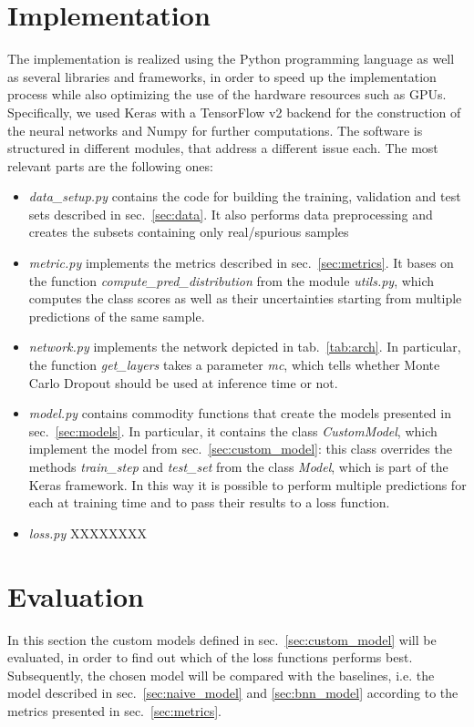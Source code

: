\documentclass[11pt,twoside,a4paper]{article}
\begin{document}
\section{Implementation}
\label{sec:implementation}
The implementation is realized using the Python programming language as well as several libraries and frameworks, in order to speed up the implementation process while also optimizing the use of the hardware resources such as GPUs. Specifically, we used Keras with a TensorFlow v2 backend for the construction of the neural networks and Numpy for further computations.\newline
The software is structured in different modules, that address a different issue each. The most relevant parts are the following ones:
\begin{itemize}
\item \emph{data\_setup.py} contains the code for building the training, validation and test sets described in sec.~\ref{sec:data}. It also performs data preprocessing and creates the subsets containing only real/spurious samples
\item \emph{metric.py} implements the metrics described in sec.~\ref{sec:metrics}. It bases on the function \emph{compute\_pred\_distribution} from the module \emph{utils.py}, which computes the class scores as well as their uncertainties starting from multiple predictions of the same sample.
\item \emph{network.py} implements the network depicted in tab.~\ref{tab:arch}. In particular, the function \emph{get\_layers} takes a parameter \emph{mc}, which tells whether Monte Carlo Dropout should be used at inference time or not.
\item \emph{model.py} contains commodity functions that create the models presented in sec.~\ref{sec:models}. In particular, it contains the class \emph{CustomModel}, which implement the model from sec.~\ref{sec:custom_model}: this class overrides the methods \emph{train\_step} and \emph{test\_set} from the class \emph{Model}, which is part of the Keras framework. In this way it is possible to perform multiple predictions for each at training time and to pass their results to a loss function.
\item \emph{loss.py} XXXXXXXX
\end{itemize}


\section{Evaluation}
\label{sec:evaluation}
In this section the custom models defined in sec.~\ref{sec:custom_model} will be evaluated, in order to find out which of the loss functions performs best. Subsequently, the chosen model will be compared with the baselines, i.e. the model described in sec.~\ref{sec:naive_model} and \ref{sec:bnn_model} according to the metrics presented in sec.~\ref{sec:metrics}.
\end{document}
